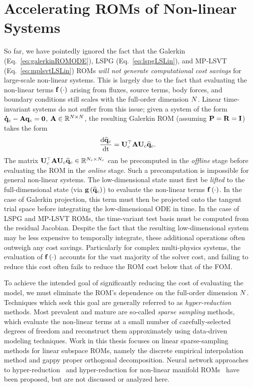 \section{Accelerating ROMs of Non-linear Systems}\label{sec:hyperreduction}

So far, we have pointedly ignored the fact that the Galerkin (Eq.~\ref{eq:galerkinROMODE}), LSPG (Eq.~\ref{eq:lspgLSLin}), and MP-LSVT (Eq.~\ref{eq:mplsvtLSLin}) ROMs \textit{will not generate computational cost savings} for large-scale non-linear systems. This is largely due to the fact that evaluating the non-linear terms $\mathbf{f} \left(\cdot\right)$ arising from fluxes, source terms, body forces, and boundary conditions still scales with the full-order dimension $N$. Linear time-invariant systems do not suffer from this issue; given a system of the form $\accentset{\mbox{\large\bfseries .}}{\mathbf{q}}_{c} - \mathbf{A} \mathbf{q}_{c} = \mathbf{0}$, $\mathbf{A} \in \mathbb{R}^{N \times N}$, the resulting Galerkin ROM (assuming $\consScale = \resScale = \identMat$) takes the form
%
\begin{equation}
    \ode{\consVecCoef}{\timeVar} = \consTrial^\top \dummyMat \consTrial \consVecCoef.
\end{equation}
%
The matrix $\consTrial^\top \dummyMat \consTrial \consVecCoef \inRTwo{\numConsModes}{\numConsModes}$ can be precomputed in the \textit{offline} stage before evaluating the ROM in the \textit{online} stage. Such a precomputation is impossible for general non-linear systems. The low-dimensional state must first be \textit{lifted} to the full-dimensional state (via $\mathbf{g} \left(\mathbf{\widehat{q}}_{c}\right)$) to evaluate the non-linear terms $\mathbf{f} \left(\cdot\right)$. In the case of Galerkin projection, this term must then be projected onto the tangent trial space before integrating the low-dimensional ODE in time. In the case of LSPG and MP-LSVT ROMs, the time-variant test basis must be computed from the residual Jacobian. Despite the fact that the resulting low-dimensional system may be less expensive to temporally integrate, these additional operations often outweigh any cost savings. Particularly for complex multi-physics systems, the evaluation of $\mathbf{f} \left(\cdot\right)$ accounts for the vast majority of the solver cost, and failing to reduce this cost often fails to reduce the ROM cost below that of the FOM. 

To achieve the intended goal of significantly reducing the cost of evaluating the model, we must eliminate the ROM's dependence on the full-order dimension $N$. Techniques which seek this goal are generally referred to as \textit{hyper-reduction} methods. Most prevalent and mature are so-called \textit{sparse sampling} methods, which evaluate the non-linear terms at a small number of carefully-selected degrees of freedom and reconstruct them approximately using data-driven modeling techniques. Work in this thesis focuses on linear sparse-sampling methods for linear subspace ROMs, namely the discrete empirical interpolation method and gappy proper orthogonal decomposition. Neural network approaches to hyper-reduction~\cite{nnHyperRed} and hyper-reduction for non-linear manifold ROMs~\cite{Kim2022} have been proposed, but are not discussed or analyzed here.

